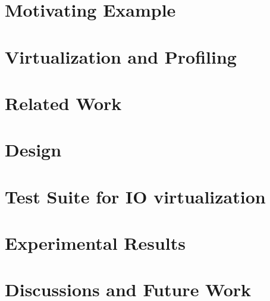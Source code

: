 \documentclass[10pt,onecolumn,oneside]{article}
\begin{document}
\section{Motivating Example}


\section{Virtualization and Profiling}


\section{Related Work}


\section{Design}


\section{Test Suite for IO virtualization}


\section{Experimental Results}


\section{Discussions and Future Work}



\end{document}
